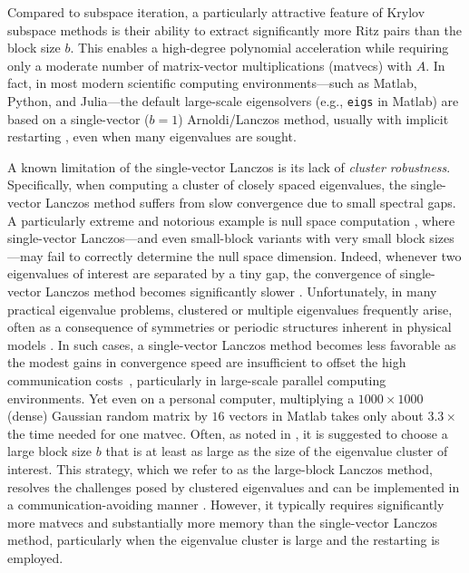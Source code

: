 \documentclass{article}
\begin{document}
Compared to subspace iteration, a particularly attractive feature of Krylov subspace methods is their ability to extract significantly more Ritz pairs than the block size $b$.
This enables a high-degree polynomial acceleration while requiring only a moderate number of matrix-vector multiplications (matvecs) with $A$. In fact, in most modern scientific computing environments---such as Matlab, Python, and Julia---the default large-scale eigensolvers (e.g., \texttt{eigs} in Matlab) are based on a single-vector ($b = 1$) Arnoldi/Lanczos method, usually with implicit restarting \cite{Lehoucq1998,wu2000thick}, even when many eigenvalues are sought.



A known limitation of the single-vector Lanczos is its lack of \emph{cluster robustness}. Specifically, when computing a cluster of closely spaced eigenvalues, the single-vector Lanczos method suffers from slow convergence due to small spectral gaps.
A particularly extreme and notorious example is null space computation \cite{kressner2024randomized}, where single-vector Lanczos---and even small-block variants with very small block sizes---may fail to correctly determine the null space dimension.
Indeed, whenever two eigenvalues of interest are separated by a tiny gap, the convergence of single-vector Lanczos method becomes significantly slower \cite{Meyer2023,kressner2024randomized}.
Unfortunately, in many practical eigenvalue problems, clustered or multiple eigenvalues frequently arise, often as a consequence of symmetries or periodic structures inherent in physical models \cite{seyranian1994multiple,bathe1973solution}.
In such cases, a single-vector Lanczos method becomes less favorable as the modest gains in convergence speed are insufficient to offset the high communication costs~\cite{Ballard2014}, particularly in large-scale parallel computing environments.  
Yet even on a personal computer, multiplying a $1000\times 1000$ (dense) Gaussian random matrix by $16$ vectors in Matlab takes only about $3.3\times$ the time needed for one matvec. 
Often, as noted in \cite[Sec.~13.12]{Parlett1998}, it is suggested to choose a large block size $b$ that is at least as large as the size of the eigenvalue cluster of interest.  This strategy, which we refer to as the large-block Lanczos method, resolves the challenges posed by clustered eigenvalues and can be implemented in a communication-avoiding manner \cite[Sec.~1.6.2]{Hoemmen2010}.
However, it typically requires significantly more matvecs and substantially more memory than the single-vector Lanczos method, particularly when the eigenvalue cluster is large and the restarting is employed.
\end{document}
